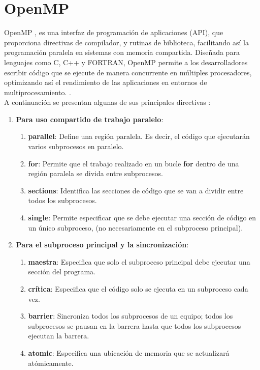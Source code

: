 \section{OpenMP}

OpenMP \cite{openmp_intro}, es una interfaz de programación de aplicaciones (API), que proporciona directivas de compilador, y rutinas de biblioteca, facilitando así la programación paralela en sistemas con memoria compartida. Diseñada para lenguajes como C, C++ y FORTRAN, OpenMP permite a los desarrolladores escribir código que se ejecute de manera concurrente en múltiples procesadores, optimizando así el rendimiento de las aplicaciones en entornos de multiprocesamiento. \cite{openmp_intro}. \\

A continuación se presentan algunas de sus principales directivas \cite{openmp_directivas}:

\begin{enumerate}[label=\textbullet]
	\item \textbf{Para uso compartido de trabajo paralelo}:
	\begin{enumerate}[label=\textbullet]
		\item \textbf{parallel}: Define una región paralela. Es decir, el código que ejecutarán varios subprocesos en paralelo.
		\item \textbf{for}: Permite que el trabajo realizado en un bucle \textbf{for} dentro de una región paralela se divida entre subprocesos.
		\item \textbf{sections}: Identifica las secciones de código que se van a dividir entre todos los subprocesos.
		\item \textbf{single}: Permite especificar que se debe ejecutar una sección de código en un único subproceso, (no necesariamente en el subproceso principal).
	\end{enumerate}
	\item \textbf{Para el subproceso principal y la sincronización}:
	\begin{enumerate}[label=\textbullet]
		\item \textbf{maestra}: Especifica que solo el subproceso principal debe ejecutar una sección del programa.
		\item \textbf{crítica}: Especifica que el código solo se ejecuta en un subproceso cada vez.
		\item \textbf{barrier}: Sincroniza todos los subprocesos de un equipo; todos los subprocesos se pausan en la barrera hasta que todos los subprocesos ejecutan la barrera.
		\item \textbf{atomic}: Especifica una ubicación de memoria que se actualizará atómicamente.
	\end{enumerate}
\end{enumerate}


